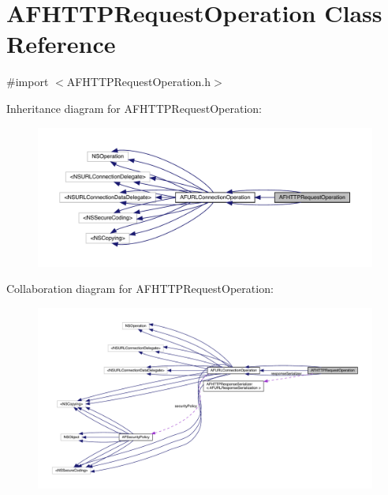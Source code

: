 \hypertarget{interface_a_f_h_t_t_p_request_operation}{}\section{A\+F\+H\+T\+T\+P\+Request\+Operation Class Reference}
\label{interface_a_f_h_t_t_p_request_operation}


{\ttfamily \#import $<$A\+F\+H\+T\+T\+P\+Request\+Operation.\+h$>$}



Inheritance diagram for A\+F\+H\+T\+T\+P\+Request\+Operation\+:\nopagebreak
\begin{figure}[H]
\begin{center}
\leavevmode
\includegraphics[width=350pt]{interface_a_f_h_t_t_p_request_operation__inherit__graph}
\end{center}
\end{figure}


Collaboration diagram for A\+F\+H\+T\+T\+P\+Request\+Operation\+:\nopagebreak
\begin{figure}[H]
\begin{center}
\leavevmode
\includegraphics[width=350pt]{interface_a_f_h_t_t_p_request_operation__coll__graph}
\end{center}
\end{figure}
